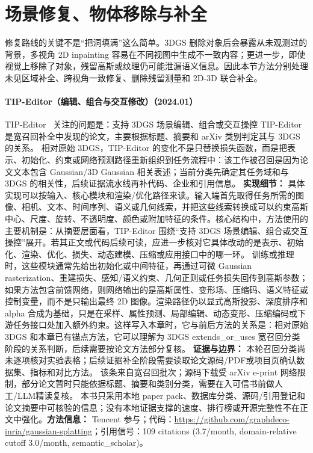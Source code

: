 \section{场景修复、物体移除与补全}

修复路线的关键不是“把洞填满”这么简单。3DGS 删除对象后会暴露从未观测过的背景，多视角 2D inpainting 容易在不同视图中生成不一致内容；更进一步，即使视觉上移除了对象，残留高斯或纹理仍可能泄漏语义信息。因此本节方法分别处理未见区域补全、跨视角一致修复、删除残留测量和 2D-3D 联合补全。
\paragraph{TIP-Editor（编辑、组合与交互修改）（2024.01）}
TIP-Editor~\cite{2401_14828} 关注的问题是：支持 3DGS 场景编辑、组合或交互操控 TIP-Editor 是宽召回补全中发现的论文，主要根据标题、摘要和 arXiv 类别判定其与 3DGS 的关系。
相对原始 3DGS，TIP-Editor 的变化不是只替换损失函数，而是把表示、初始化、约束或网络预测路径重新组织到任务流程中：该工作被召回是因为论文文本包含 Gaussian/3D Gaussian 相关表述；当前分类先确定其任务域和与 3DGS 的相关性，后续证据流水线再补代码、企业和引用信息。
\textbf{实现细节：} 具体实现可以按输入、核心模块和渲染/优化路径来读。输入端首先取得任务所需的图像、相机、文本、时间序列、语义或几何线索，并把这些线索转换成可以约束高斯中心、尺度、旋转、不透明度、颜色或附加特征的条件。核心结构中，方法使用的主要机制是：从摘要层面看，TIP-Editor 围绕“支持 3DGS 场景编辑、组合或交互操控”展开。若其正文或代码后续可读，应进一步核对它具体改动的是表示、初始化、渲染、优化、损失、动态建模、压缩或应用接口中的哪一环。 训练或推理时，这些模块通常先给出初始化或中间特征，再通过可微 Gaussian rasterization、重建损失、感知/语义约束、几何正则或任务损失回传到高斯参数；如果方法包含前馈网络，则网络输出的是高斯属性、变形场、压缩码、语义特征或控制变量，而不是只输出最终 2D 图像。渲染路径仍以显式高斯投影、深度排序和 alpha 合成为基础，只是在采样、属性预测、局部编辑、动态变形、压缩编码或下游任务接口处加入额外约束。这样写入本章时，它与前后方法的关系是：相对原始 3DGS 和本章已有锚点方法，它可以理解为 3DGS extends\_or\_uses 宽召回分类阶段的关系判断，后续需要按论文方法部分复核。
\textbf{证据与边界：} 本轮召回分类尚未逐项核对实验表格；后续证据补全阶段需要读取论文源码/PDF或项目页确认数据集、指标和对比方法。 该条来自宽召回批次；源码下载受 arXiv e-print 网络限制，部分论文暂时只能依据标题、摘要和类别分类，需要在入可信书前做人工/LLM精读复核。 本书只采用本地 paper pack、数据库分类、源码/引用登记和论文摘要中可核验的信息；没有本地证据支撑的速度、排行榜或开源完整性不在正文中强化。\textbf{方法信息：} Tencent 参与；代码：\url{https://github.com/graphdeco-inria/gaussian-splatting}；引用信号：109 citations (3.7/month, domain-relative cutoff 3.0/month, semantic\_scholar)。
